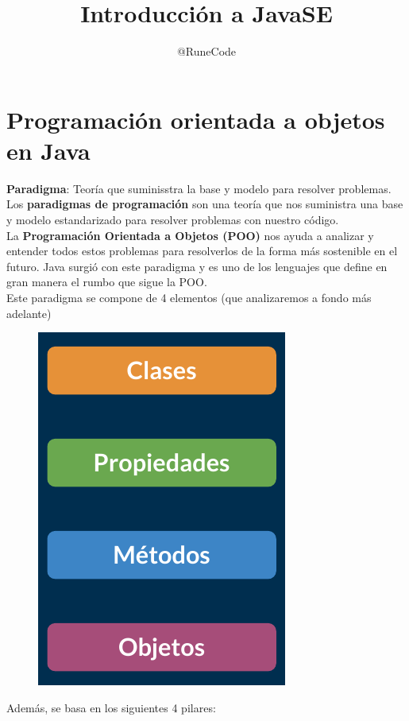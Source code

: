 \documentclass{article}
\title{Introducción a JavaSE}
\author{@RuneCode}
\begin{document}


\section{Programación orientada a objetos en Java}%
\textbf{Paradigma}: Teoría que suminisstra la base y modelo para resolver problemas.\\

Los \textbf{paradigmas de programación} son una teoría que nos suministra una
base y modelo estandarizado para resolver problemas con nuestro código.\\

La \textbf{Programación Orientada a Objetos (POO)} nos ayuda a analizar y
entender todos estos problemas para resolverlos de la forma más sostenible en
el futuro. Java surgió con este paradigma y es uno de los lenguajes que define
en gran manera el rumbo que sigue la POO.\\

Este paradigma se compone de 4 elementos (que analizaremos a fondo más
adelante)\\

\begin{figure}[h!]
  \centering
  \includegraphics[scale=0.45]{./Pictures/001_poo_elementos.png}
\end{figure}

Además, se basa en los siguientes 4 pilares:\\
\end{document}

